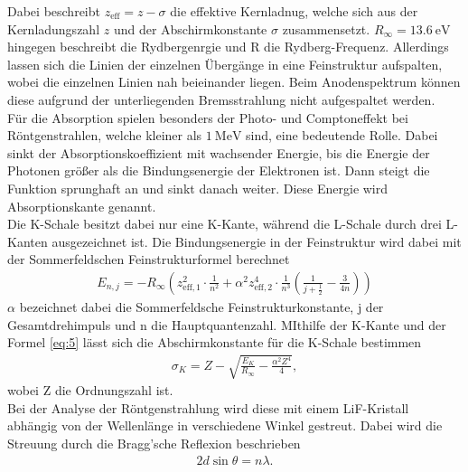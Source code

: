Dabei beschreibt $z_{\text{eff}} =z-\sigma $ die effektive Kernladnug, welche sich aus der 
Kernladungszahl $z$ und der Abschirmkonstante $\sigma$ zusammensetzt. $R_{\infty}=\SI{13.6}{\electronvolt} $ hingegen
beschreibt die Rydbergenrgie und R die Rydberg-Frequenz.
Allerdings lassen sich die Linien der einzelnen Übergänge in eine Feinstruktur aufspalten, wobei die einzelnen
Linien nah beieinander liegen. Beim Anodenspektrum können diese aufgrund der unterliegenden Bremsstrahlung
nicht aufgespaltet werden.\\
Für die Absorption spielen besonders der Photo- und Comptoneffekt bei Röntgenstrahlen, welche kleiner
als $\SI{1}{\mega\electronvolt} $ sind, eine bedeutende Rolle. 
Dabei sinkt der Absorptionskoeffizient mit wachsender Energie, bis die Energie der Photonen
größer als die Bindungsenergie der Elektronen ist. Dann steigt die Funktion sprunghaft an und sinkt danach weiter.
Diese Energie wird Absorptionskante genannt.\\
Die K-Schale besitzt dabei nur eine K-Kante, während die L-Schale durch drei L-Kanten ausgezeichnet ist.
Die Bindungsenergie in der Feinstruktur wird dabei mit der Sommerfeldschen Feinstrukturformel berechnet \cite{V602}
\begin{align}
    E_{n,j}= - R_{\infty} \left(z_{\text{eff},1}^2\cdot \frac{1}{n^2}+\alpha ^2 z_{\text{eff},2}^4\cdot \frac{1}{n^3}\left(\frac{1}{j+\frac{1}{2}}-\frac{3}{4n} \right) \right) \label{eq:5}
\end{align}
$\alpha$ bezeichnet dabei die Sommerfeldsche Feinstrukturkonstante, j der Gesamtdrehimpuls und n 
die Hauptquantenzahl.
MIthilfe der K-Kante und der Formel \eqref{eq:5} lässt sich die Abschirmkonstante für die
K-Schale bestimmen \cite{V602}
\begin{align}
    \sigma _K = Z-\sqrt{\frac{E_K}{R_{\infty}}-\frac{\alpha^2Z^4}{4}} \label{eq:6},
\end{align}
wobei Z die Ordnungszahl ist.\\
Bei der Analyse der Röntgenstrahlung wird diese mit einem LiF-Kristall abhängig von der Wellenlänge in verschiedene
Winkel gestreut. Dabei wird die Streuung durch die Bragg'sche Reflexion beschrieben \cite{V602}
\begin{align}
    2d \sin \theta =n \lambda \label{eq:7}.
\end{align}


